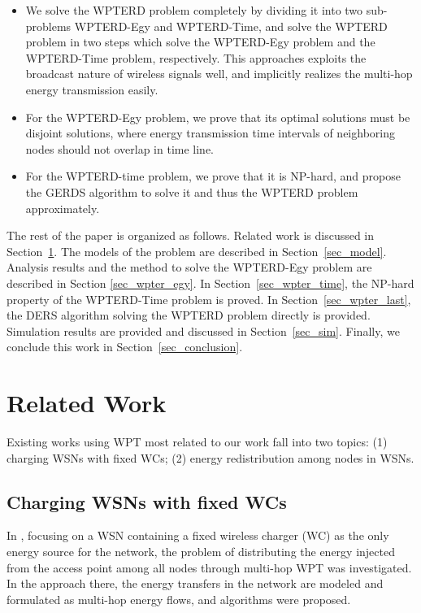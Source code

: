 \documentclass[journal,10pt]{IEEEtran}
\begin{document}
\begin{itemize}
\item{We solve the WPTERD problem completely by dividing it into two sub-problems WPTERD-Egy and WPTERD-Time, and solve the WPTERD problem in two steps which solve the WPTERD-Egy problem and the WPTERD-Time problem, respectively. This approaches exploits the broadcast nature of wireless signals well, and implicitly realizes the multi-hop energy transmission easily.}
\item{For the WPTERD-Egy problem, we prove that its optimal solutions must be disjoint solutions, where energy transmission time intervals of neighboring nodes should not overlap in time line.}
\item{For the WPTERD-time problem, we prove that it is NP-hard, and propose the GERDS algorithm to solve it and thus the WPTERD problem approximately.}
\end{itemize}

The rest of the paper is organized as follows. Related work is discussed in Section~\ref{sec_relwork}. The models of the problem are described in Section~\ref{sec_model}. Analysis results and the method to solve the WPTERD-Egy problem are described in Section \ref{sec_wpter_egy}. In Section~\ref{sec_wpter_time}, the NP-hard property of the WPTERD-Time problem is proved. In Section~\ref{sec_wpter_last}, the DERS algorithm solving the WPTERD problem directly is provided. Simulation results are provided and discussed in Section~\ref{sec_sim}. Finally, we conclude this work in Section~\ref{sec_conclusion}.

\section{Related Work}
\label{sec_relwork}
Existing works using WPT most related to our work fall into two topics: (1) charging WSNs with fixed WCs; (2) energy redistribution among nodes in WSNs.

\subsection{Charging WSNs with fixed WCs}

In \cite{Xiang2013}, focusing on a WSN containing a fixed wireless charger (WC) as the only energy source for the network, the problem of distributing the energy injected from the access point among all nodes through multi-hop WPT was investigated. In the approach there, the energy transfers in the network are modeled and formulated as multi-hop energy flows, and algorithms were proposed.
\end{document}
